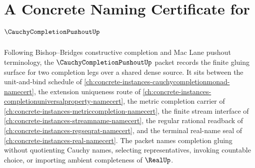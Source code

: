 \chapter{A Concrete Naming Certificate for $\CauchyCompletionPushoutUp$}
\label{ch:concrete-instances-cauchy-completion-pushout-namecert}

Following Bishop--Bridges constructive completion and Mac Lane pushout terminology, the $\CauchyCompletionPushoutUp$ packet records the finite gluing surface for two completion legs over a shared dense source. It sits between the unit-and-bind schedule of \autoref{ch:concrete-instances-cauchycompletionmonad-namecert}, the extension uniqueness route of \autoref{ch:concrete-instances-completionuniversalproperty-namecert}, the metric completion carrier of \autoref{ch:concrete-instances-metriccompletion-namecert}, the finite stream interface of \autoref{ch:concrete-instances-streamname-namecert}, the regular rational readback of \autoref{ch:concrete-instances-regseqrat-namecert}, and the terminal real-name seal of \autoref{ch:concrete-instances-real-namecert}. The packet names completion gluing without quotienting Cauchy names, selecting representatives, invoking countable choice, or importing ambient completeness of $\RealUp$.

